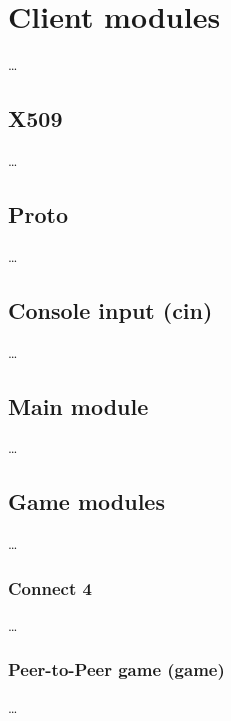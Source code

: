 \section{Client modules}\label{sec:clientmod}

\ldots

\subsection{X509}\label{subsec:clientx509mod}

\ldots

\subsection{Proto}\label{subsec:clientprotomod}

\ldots

\subsection{Console input (cin)}\label{subsec:cinmod}

\ldots

\subsection{Main module}\label{subsec:clientmainmod}

\ldots

\subsection{Game modules}\label{subsec:gamemods}

\ldots

\subsubsection{Connect 4}

\ldots

\subsubsection{Peer-to-Peer game (game)}

\ldots
